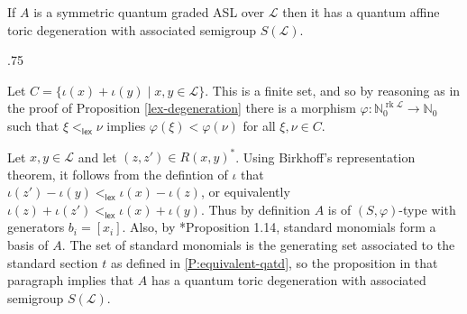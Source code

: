 \documentclass[11pt,fleqn]{article}
\makeatletter
\renewenvironment{proof}[1][\textit{Proof}]{\par
  \pushQED{\qed}%
  \normalfont \topsep.75\paraskip\relax
  \trivlist
  \item[\hskip\labelsep
        \itshape
    #1\@addpunct{.}]\ignorespaces
}{%
  \popQED\endtrivlist\@endpefalse
}
\newcommand\NN{\mathbb N}
\renewcommand\to{\longrightarrow}
\renewcommand\phi{\varphi}
\renewcommand\L{\mathcal L}
\newcommand\lex{\mathsf{lex}}
\DeclareMathOperator\rk{rk}
\makeatother
\begin{document}
\begin{Theorem} 
\label{T:ASL-are-dominated} 
If $A$ is a symmetric quantum graded ASL over $\L$ then it has a quantum affine toric 
degeneration with associated semigroup $S(\L)$.
\end{Theorem} 
\begin{proof} 
Let $C = \{\iota(x) + \iota(y) \mid x,y \in \L\}$. This is a finite set, and so by 
reasoning as in the proof of Proposition \ref{lex-degeneration} there is a morphism 
$\phi: \NN_0^{\rk \L} \to \NN_0$ such that $\xi <_{\lex} \nu$ implies $\phi(\xi) < 
\phi(\nu)$ for all $\xi, \nu \in C$. 

Let $x,y \in \L$ and let $(z,z') \in R(x,y)^*$. Using Birkhoff's representation theorem, 
it follows from the defintion of $\iota$ that $\iota(z') - \iota(y) <_{\lex} \iota(x) - 
\iota(z)$, or equivalently $\iota(z) + \iota(z') <_{\lex} \iota(x) + \iota(y)$. Thus by 
definition $A$ is of $(S,\phi)$-type with generators $b_i = [x_i]$. Also, by 
\cite{LR1}*{Proposition 1.14}, standard monomials form a basis of $A$. The set of 
standard monomials is the generating set associated to the standard section $t$ as 
defined in \ref{P:equivalent-qatd}, so the proposition in that paragraph implies that
$A$ has a quantum toric degeneration with associated semigroup $S(\L)$.
\end{proof}
\end{document}
